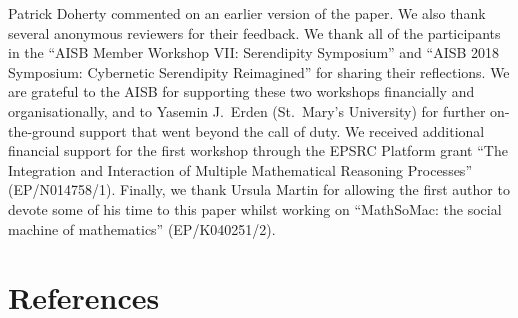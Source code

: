 \documentclass[natbib,a4paper,preprint,number,sort&compress,times]{elsarticle}
\begin{document}
Patrick Doherty commented on an earlier version of the paper.
We also thank several anonymous reviewers for their feedback.
We thank all of the participants in the ``AISB Member Workshop VII:
Serendipity Symposium'' and ``AISB 2018 Symposium: Cybernetic
Serendipity Reimagined'' for sharing their reflections.
We are grateful to the AISB for supporting these two workshops
financially and organisationally, and to Yasemin J.~Erden (St.~Mary's
University) for further on-the-ground support that went beyond the
call of duty.
We received additional financial support for the first workshop
through the EPSRC Platform grant ``The Integration and Interaction of
Multiple Mathematical Reasoning Processes'' (EP/N014758/1).
Finally, we thank Ursula Martin for allowing the first author to
devote some of his time to this paper whilst working on ``MathSoMac:
the social machine of mathematics'' (EP/K040251/2).






\DeclareRobustCommand{\VAN}[3]{#3}


\section*{References}






\end{document}
